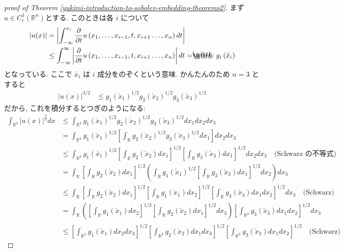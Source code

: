 \documentclass[openany, a4paper, oneside]{jsbook}
\makeatletter
\newcommand*{\eqdef}{=\mathrel{\hbox to 0pt{%
\raisebox{0.3ex}{$\m@th\cdot$}}%
\raisebox{-0.3ex}{$\m@th\cdot$}}%
}
\theoremstyle{break}
\theoremstyle{breakdefn}
\newcommand{\abs}[1]{\left|#1\right|}
\newcommand{\rbk}[1]{\left (#1\right)}
\newcommand{\sqbk}[1]{\left[#1\right]}
\newcommand{\bbR}{\mathbb{R}}
\newcommand{\bbRn}{\mathbb{R}^n}
\makeatother
\begin{document}
\begin{proof}[proof of Theorem \ref{yukimi-introduction-to-sobolev-embedding-theorems2}]
まず$u \in C_c^1 (\bbRn)$とする.
このときは各 $i$ について
\begin{align}\label{yukimi-introduction-to-sobolev-embedding-theorems3}
 \abs{u(x)}
 &=
 \abs{\int_{-\infty}^{x_i} \frac{\partial}{\partial t} u \rbk{x_1, \dots , x_{i-1}, t, x_{i+1} \dots, x_n} dt} \\
 &\le
 \int_{-\infty}^{\infty}
  \abs{\frac{\partial}{\partial t} u \rbk{x_1, \dots , x_{i-1}, t, x_{i+1} \dots, x_n}} dt
  \eqdef g_i \rbk{\check{x}_i}
\end{align}
となっている.
ここで $\check{x_i}$ は $i$ 成分をのぞくという意味.
かんたんのため $n = 3$ とすると
\begin{align}
 \abs{u(x)}^{3/2}
 &\leq
 g_1(\check{x}_1)^{1/2} g_2(\check{x}_2)^{1/2} g_3(\check{x}_3)^{1/2}
\end{align}
だから, これを積分するとつぎのようになる:
\begin{align}
 \int_{\bbR^3} \abs{u(x)}^{\frac{3}{2}}dx
 &\le
 \int_{\bbR^3} g_1(\check{x}_1)^{1/2} g_2(\check{x}_2)^{1/2} g_3 (\check{x}_3)^{1/2} dx_1 dx_2 dx_3 \\
 &=
 \int_{\mathbb{R}^2} g_1(\check{x}_1)^{1/2}
 \sqbk{\int_{\bbR} g_2(\check{x}_2)^{1/2} g_3(\check{x}_3)^{1/2} dx_1} dx_2 dx_3 \\
 &\le
 \int_{\bbR^2} g_1(\check{x_1})^{1/2}
  \sqbk{\int_{\bbR} g_2 (\check{x}_2) dx_1}^{1/2}
  \sqbk{\int_{\mathbb{R}} g_3 (\check{x}_3) dx_1}^{1/2} dx_2 dx_3 \quad \text{(Schwarz の不等式)} \\
 &=
 \int_{\bbR} \sqbk{\int_{\mathbb{R}} g_2(\check{x}_2) dx_1}^{1/2}
  \rbk{\int_{\mathbb{R}}g_1 (\check{x}_1)^{1/2} \sqbk{\int_{\bbR} g_3(\check{x}_3) dx_1}^{1/2} dx_2} dx_3 \\
 &\le
 \int_{\bbR} \sqbk{\int_{\mathbb{R}} g_2(\check{x}_2) dx_1}^{1/2}
  \sqbk{\int_{\bbR} g_1(\check{x}_1) dx_2}^{1/2}
  \sqbk{\int_{\bbR} g_3(\check{x}_3) dx_1 dx_2}^{1/2} dx_3 \quad \text{(Schwarz)} \\
 &=
 \int_{\bbR}
  \rbk{\sqbk{\int_{\bbR} g_1(\check{x}_1) dx_2}^{1/2} \sqbk{\int_{\bbR} g_2(\check{x}_2) dx_1}^{1/2} dx_3}
  \sqbk{\int_{\bbR^2} g_3(\check{x}_3) dx_1 dx_2}^{1/2} dx_3 \\
 &\le
 \sqbk{\int_{\bbR^2} g_1(\check{x}_1) dx_2 dx_3}^{1/2}
  \sqbk{\int_{\bbR^2} g_2(\check{x}_2) dx_1 dx_3}^{1/2}
  \sqbk{\int_{\bbR^2} g_3(\check{x}_3) dx_1 dx_2}^{1/2}
  \quad \text{(Schwarz)}
\end{align}

\end{proof}
\end{document}
